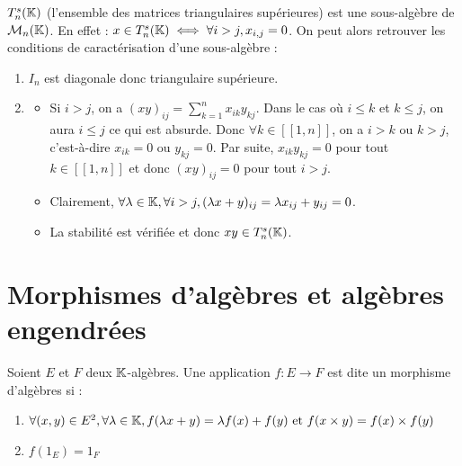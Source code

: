 \documentclass[11pt,a4paper]{report}
\begin{document}
\begin{example}
    $T_n^s(\mathbb{K})$ (l'ensemble des matrices triangulaires supérieures) est une sous-algèbre de $\mathcal M_n(\mathbb{K})$. En effet : $x \in T_n^s(\mathbb{K}) \iff \forall i > j, x_{i,j} = 0$. On peut alors retrouver les conditions de caractérisation d'une sous-algèbre :
    \begin{enumerate}
        \item $I_n$ est diagonale donc triangulaire supérieure.
        \item \begin{itemize}
            \item Si $i > j$, on a $(xy)_{ij} = \sum_{k=1}^n x_{ik}y_{kj}$. Dans le cas où $i \le k$ et $k \le j$, on aura $i \le j$ ce qui est absurde. Donc $\forall k \in [\![1,n]\!]$, on a $i > k$ ou $k > j$, c'est-à-dire $x_{ik} = 0$ ou $y_{kj} = 0$. Par suite, $x_{ik}y_{kj} = 0$ pour tout $k \in [\![1,n]\!]$ et donc $(xy)_{ij} = 0$ pour tout $i > j$.
            \item Clairement, $\forall \lambda \in \mathbb{K}, \forall i > j, (\lambda x + y)_{ij} = \lambda x_{ij} + y_{ij} = 0$.
            \item La stabilité est vérifiée et donc $xy \in T_n^s(\mathbb{K})$.
        \end{itemize}
    \end{enumerate}
\end{example}

\chapter{Morphismes d'algèbres et algèbres engendrées}

\begin{definition}
    Soient $E$ et $F$ deux $\mathbb{K}$-algèbres. Une application $f : E \to F$ est dite un morphisme d'algèbres si :
    \begin{enumerate}
        \item $\forall (x,y) \in E^2,\forall \lambda \in \mathbb{K}, f(\lambda x + y) = \lambda f(x) + f(y) \text{ et } f(x\times y) = f(x)\times f(y)$
        \item $f(1_E) = 1_F$
    \end{enumerate}
\end{definition}
\end{document}

